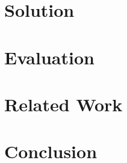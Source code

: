 \documentclass{sig-alternate-10pt}
\begin{document}
\section{Solution}





\section{Evaluation}
\label{sec:eval}



\section{Related Work}




\section{Conclusion}





\clearpage

\newpage




\end{document}
